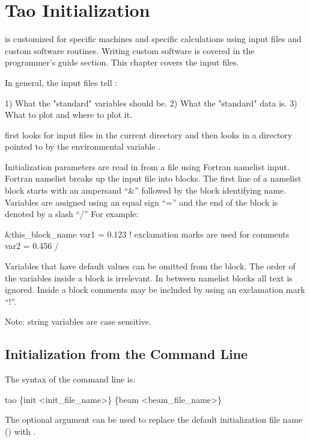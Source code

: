 \chapter{Tao Initialization}
\label{c:init}

\tao is customized for specific machines and specific calculations
using input files and custom software routines. Writing custom
software is covered in the programmer's guide section. This chapter
covers the input files.

In general, the input files tell \tao:
\begin{example}
  1) What the "standard" variables should be.
  2) What the "standard" data is.
  3) What to plot and where to plot it.
\end{example}

\tao first looks for input files in the current directory and then
looks in a directory pointed to by the environmental variable
.

Initialization parameters are read in from a file using Fortran
namelist input. Fortran namelist breaks up the input file into
blocks. The first line of a namelist block starts with an ampersand
``\&'' followed by the block identifying name. Variables are assigned
using an equal sign ``='' and the end of the block is denoted by a
slash ``/'' For example:
\begin{example}
  &this_block_name
    var1 = 0.123   ! exclamation marks are used for comments
    var2 = 0.456
  /
\end{example}
Variables that have default values can be omitted from the block.  The
order of the variables inside a block is irrelevant.  In between
namelist blocks all text is ignored. Inside a block comments may be
included by using an exclamation mark ``!''.

Note: string variables are case sensitive.

\section{Initialization from the Command Line}
\label{s:command_line} 

The syntax of the command line is:
\begin{example}
  tao \{init <init_file_name>\} \{beam <beam_file_name>\}
\end{example}
The  optional argument can be used to replace the default
initialization file name () with .

